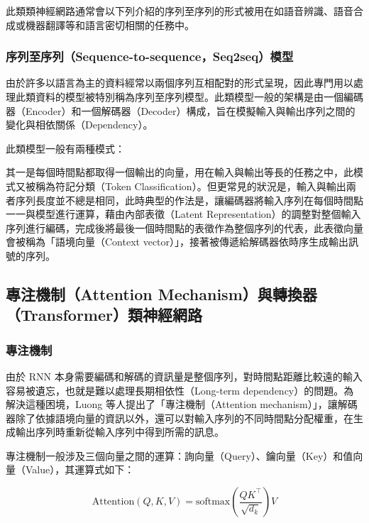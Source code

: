 



此類類神經網路通常會以下列介紹的序列至序列的形式被用在如語音辨識、語音合成或機器翻譯等和語言密切相關的任務中。

\subsubsection{序列至序列（Sequence-to-sequence，Seq2seq）模型}

由於許多以語言為主的資料經常以兩個序列互相配對的形式呈現，因此專門用以處理此類資料的模型被特別稱為序列至序列模型。此類模型一般的架構是由一個編碼器（Encoder）和一個解碼器（Decoder）構成，旨在模擬輸入與輸出序列之間的變化與相依關係（Dependency）。

此類模型一般有兩種模式：

其一是每個時間點都取得一個輸出的向量，用在輸入與輸出等長的任務之中，此模式又被稱為符記分類（Token Classification）。但更常見的狀況是，輸入與輸出兩者序列長度並不總是相同，此時典型的作法是，讓編碼器將輸入序列在每個時間點一一與模型進行運算，藉由內部表徵（Latent Representation）的調整對整個輸入序列進行編碼，完成後將最後一個時間點的表徵作為整個序列的代表，此表徵向量會被稱為「語境向量（Context vector）」，接著被傳遞給解碼器依時序生成輸出訊號的序列。

\subsection{專注機制（Attention Mechanism）與轉換器（Transformer）類神經網路}

\subsubsection{專注機制}

由於 RNN 本身需要編碼和解碼的資訊量是整個序列，對時間點距離比較遠的輸入容易被遺忘，也就是難以處理長期相依性（Long-term dependency）的問題。為解決這種困境，Luong 等人提出了「專注機制（Attention mechanism）」，讓解碼器除了依據語境向量的資訊以外，還可以對輸入序列的不同時間點分配權重，在生成輸出序列時重新從輸入序列中得到所需的訊息。

專注機制一般涉及三個向量之間的運算：詢向量（Query）、鑰向量（Key）和值向量（Value），其運算式如下：


\[\text{Attention}(Q, K, V) = \text{softmax}
\left(
\frac{QK^\top}{\sqrt{d_k}}
\right)
V\]


